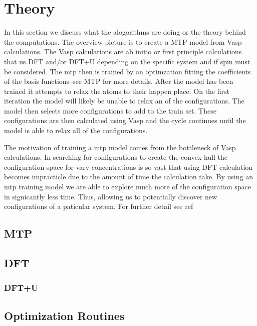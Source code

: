 \documentclass{article}
\begin{document}

\section{Theory}
In this section we discuss what the alogorithms are doing or the
theory behind the computations. The overview picture is to create a
MTP model from Vasp calculations. The Vasp calculations are ab initio
or first principle calculations that us DFT and/or DFT+U depending on
the specific system and if spin must be considered. The mtp then is
trained by an optimzation fitting the coefficients of the basis
functions--see MTP for more details. After the model has been trained
it attempts to relax the atoms to their happen place. On the first
iteration the model will likely be unable to relax an of the
configurations. The model then selects more configurations to add to
the train set. These configurations are then calculated using Vasp and
the cycle continues until the model is able to relax all of the
configurations.

The motivation of training a mtp model comes from the bottleneck of
Vasp calculations. In searching for configurations to create the
convex hull the configuration space for vary concentrations is so vast
that using DFT calculation becomes impracticle due to the amount of
time the calculation take. By using an mtp training model we are able
to explore much more of the configuration space in signicantly less
time. Thus, allowing us to potentially discover new configurations of
a paticular system. For further detail see ref \cite{} 

\subsection{MTP}

\subsection{DFT}

\subsubsection{DFT+U}

\subsection{Optimization Routines}
\end{document}
